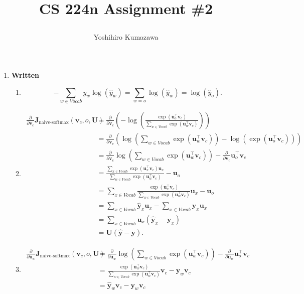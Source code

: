 \documentclass[12pt, dvipdfmx]{article}
\title{
  \vspace{-2cm}
  CS 224n Assignment \#2 \\
  \author{Yoshihiro Kumazawa}
}
\begin{document}
\maketitle
\begin{enumerate}[label=\textbf{\arabic*}]
  \item \textbf{Written}
  \begin{enumerate}[label=(\alph*)]
    \item \[-\sum_{w\in Vocab}y_w\log(\hat{y}_w)=\sum_{w=o}\log(\hat{y}_w)=\log(\hat{y}_o).\]
    \item
    \begin{align*}
      \frac{\partial}{\partial\bm{v}_c}\bm{J}_{\textrm{naive-softmax}}(\bm{v}_c,o,\bm{U}) &=\frac{\partial}{\partial\bm{v}_c}\left(-\log\left(\frac{\exp(\bm{u}_o^\top\bm{v}_c)}{\sum_{w\in Vocab}\exp(\bm{u}_w^\top\bm{v}_c)}\right)\right) \\
      &=\frac{\partial}{\partial\bm{v}_c}\left(\log\left(\sum_{w\in Vocab}\exp(\bm{u}_w^\top\bm{v}_c)\right)-\log\left(\exp(\bm{u}_o^\top\bm{v}_c)\right)\right) \\
      &=\frac{\partial}{\partial\bm{v}_c}\log\left(\sum_{w\in Vocab}\exp(\bm{u}_w^\top\bm{v}_c)\right)-\frac{\partial}{\partial\bm{v}_c}\bm{u}_o^\top\bm{v}_c \\
      &=\frac{\sum_{x\in Vocab}\exp(\bm{u}_x^\top\bm{v}_c)\bm{u}_x}{\sum_{w\in Vocab}\exp(\bm{u}_w^\top\bm{v}_c)}-\bm{u}_o \\
      &=\sum_{x\in Vocab}\frac{\exp(\bm{u}_x^\top\bm{v}_c)}{\sum_{w\in Vocab}\exp(\bm{u}_w^\top\bm{v}_c)}\bm{u}_x-\bm{u}_o \\
      &=\sum_{x\in Vocab}\bm{\hat{y}}_x\bm{u}_x-\sum_{x\in Vocab}\bm{y}_x\bm{u}_x \\
      &=\sum_{x\in Vocab}\bm{u}_x(\bm{\hat{y}}_x-\bm{y}_x) \\
      &=\bm{U}(\bm{\hat{y}}-\bm{y}).
    \end{align*}
    \item
    \begin{align*}
      \frac{\partial}{\partial\bm{u}_w}\bm{J}_{\textrm{naive-softmax}}(\bm{v}_c,o,\bm{U}) &=\frac{\partial}{\partial\bm{u}_w}\log\left(\sum_{w\in Vocab}\exp(\bm{u}_w^\top\bm{v}_c)\right)-\frac{\partial}{\partial\bm{u}_w}\bm{u}_o^\top\bm{v}_c \\
      &=\frac{\exp(\bm{u}_w^\top\bm{v}_c)}{\sum_{w\in Vocab}\exp(\bm{u}_w^\top\bm{v}_c)}\bm{v}_c-\bm{y}_w\bm{v}_c \\
      &=\bm{\hat{y}}_w\bm{v}_c-\bm{y}_w\bm{v}_c \\

\end{align*}
\end{enumerate}
\end{enumerate}
\end{document}
